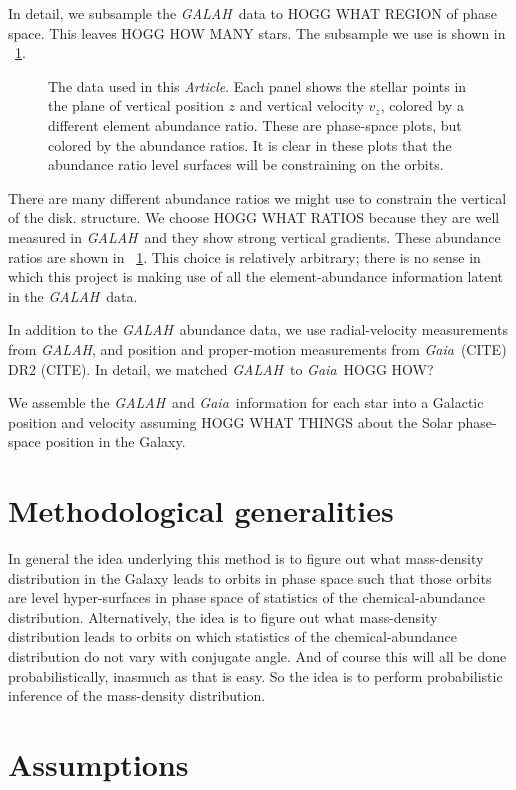 \documentclass[modern]{aastex62}
\newcommand{\documentname}{\textsl{Article}}
\newcommand{\acronym}[1]{{\small{#1}}}
\newcommand{\project}[1]{\textsl{#1}}
\newcommand{\galah}{\project{\acronym{GALAH}}}
\newcommand{\gaia}{\project{Gaia}}
\begin{document}
In detail, we subsample the \galah\ data to HOGG WHAT REGION of phase space.
This leaves HOGG HOW MANY stars.
The subsample we use is shown in \figurename~\ref{fig:data}.
\begin{figure}
\caption{The data used in this \documentname. Each panel shows the stellar points in the
plane of vertical position $z$ and vertical velocity $v_z$, colored by a different element
abundance ratio. These are phase-space plots, but colored by the abundance ratios.
It is clear in these plots that the abundance ratio level surfaces will be
constraining on the orbits.\label{fig:data}}
\end{figure}

There are many different abundance ratios we might use to constrain the vertical of the disk.
structure.
We choose HOGG WHAT RATIOS because they are well measured in \galah\ and they show strong
vertical gradients.
These abundance ratios are shown in \figurename~\ref{fig:data}.
This choice is relatively arbitrary; there is no sense in which this project is making use
of all the element-abundance information latent in the \galah\ data.

In addition to the \galah\ abundance data, we use radial-velocity measurements from \galah,
and position and proper-motion measurements from \gaia\ (CITE) \acronym{DR2} (CITE).
In detail, we matched \galah\ to \gaia\ HOGG HOW?

We assemble the \galah\ and \gaia\ information for each star into a Galactic position and
velocity assuming HOGG WHAT THINGS about the Solar phase-space position in the Galaxy.

\section{Methodological generalities}

In general the idea underlying this method is to figure out what mass-density distribution
in the Galaxy leads to orbits in phase space such that those orbits are level
hyper-surfaces in phase space of statistics of the chemical-abundance distribution.
Alternatively, the idea is to figure out what mass-density distribution leads to orbits
on which statistics of the chemical-abundance distribution do not vary with conjugate
angle.
And of course this will all be done probabilistically, inasmuch as that is easy.
So the idea is to perform probabilistic inference of the mass-density distribution.

\section{Assumptions}
\end{document}
